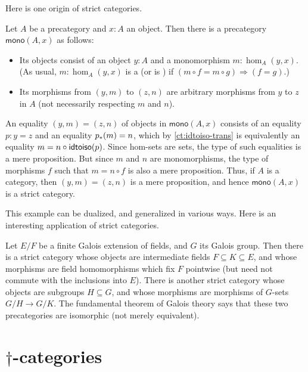 Here is one origin of strict categories.

\begin{eg}\label{ct:mono-cat}
  Let $A$ be a precategory and $x:A$ an object.
  Then there is a precategory $\mathsf{mono}(A,x)$ as follows:
  \begin{itemize}
  \item Its objects consist of an object $y:A$ and a monomorphism $m:\hom_A(y,x)$.
    (As usual, $m:\hom_A(y,x)$ is a  (or is ) if $(m\circ f = m\circ g) \Rightarrow (f=g)$.)
  \item Its morphisms from $(y,m)$ to $(z,n)$ are arbitrary morphisms from $y$ to $z$ in $A$ (not necessarily respecting $m$ and $n$).
  \end{itemize}
  An equality $(y,m)=(z,n)$ of objects in $\mathsf{mono}(A,x)$ consists of an equality $p:y=z$ and an equality ${p}_{*}\mathopen{}\left({m}\right)\mathclose{}=n$, which by \cref{ct:idtoiso-trans} is equivalently an equality $m=n\circ \mathsf{idtoiso}(p)$.
  Since hom-sets are sets, the type of such equalities is a mere proposition.
  But since $m$ and $n$ are monomorphisms, the type of morphisms $f$ such that $m = n\circ f$ is also a mere proposition.
  Thus, if $A$ is a category, then $(y,m)=(z,n)$ is a mere proposition, and hence $\mathsf{mono}(A,x)$ is a strict category.
\end{eg}

This example can be dualized, and generalized in various ways.
Here is an interesting application of strict categories.

\begin{eg}\label{ct:galois}
  Let $E/F$ be a finite Galois extension
  of fields, and $G$ its Galois group.
  Then there is a strict category whose objects are intermediate fields $F\subseteq K\subseteq E$, and whose morphisms are field homomorphisms which fix $F$ pointwise (but need not commute with the inclusions into $E$).
  There is another strict category whose objects are subgroups $H\subseteq G$, and whose morphisms are morphisms of $G$-sets $G/H \to G/K$.
  The fundamental theorem of Galois theory
  says that these two precategories are isomorphic (not merely equivalent).
\end{eg}

%

\section{\texorpdfstring{$\dagger$}{†}-categories}
\label{sec:dagger-categories}

